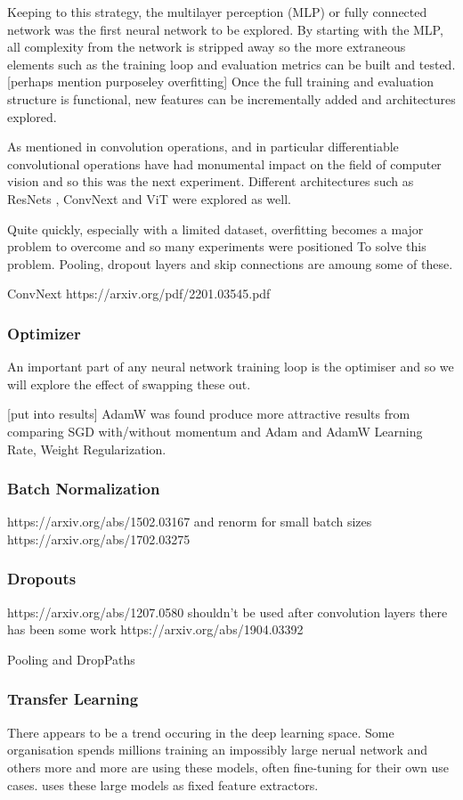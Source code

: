 Keeping to this strategy, the multilayer perception (MLP) or fully connected network \cite{} was the first neural network to be explored.
By starting with the MLP, all complexity from the network is stripped away so the more extraneous elements such as the training loop and 
evaluation metrics can be built and tested.  [perhaps mention purposeley overfitting]
Once the full training and evaluation structure is functional, new features can be incrementally added and architectures explored.

As mentioned in  convolution operations, and in particular differentiable convolutional operations have had monumental 
impact on the field of computer vision and so this was the next experiment.  Different architectures such as ResNets \cite{}, ConvNext \cite{}
and ViT were explored as well.

Quite quickly, especially with a limited dataset, overfitting becomes a major problem to overcome and so many experiments were positioned To
solve this problem.  Pooling, dropout layers and skip connections are amoung some of these.

ConvNext https://arxiv.org/pdf/2201.03545.pdf

\subsubsection{Optimizer}
An important part of any neural network training loop is the optimiser and so we will explore the effect of swapping these out.

[put into results]
AdamW was found produce more attractive results from comparing SGD with/without momentum and Adam and AdamW \cite{}
Learning Rate, Weight Regularization.

\subsubsection{Batch Normalization}
https://arxiv.org/abs/1502.03167 and renorm for small batch sizes https://arxiv.org/abs/1702.03275

\subsubsection{Dropouts}
https://arxiv.org/abs/1207.0580 shouldn't be used after convolution layers \cite{} there has been some work https://arxiv.org/abs/1904.03392

Pooling and DropPaths

\subsubsection{Transfer Learning}
There appears to be a trend occuring in the deep learning space.  Some organisation spends millions training an impossibly large nerual network
and others more and more are using these models, often fine-tuning for their own use cases.  \cite{} uses these large models as fixed feature extractors.

